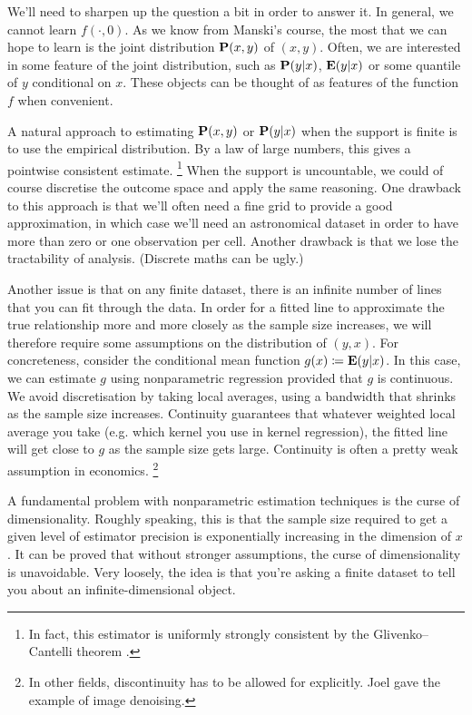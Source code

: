 \documentclass[11pt,letterpaper,reqno,oneside]{article}
\begin{document}
We'll need to sharpen up the question a bit in order to answer it. In general, we cannot learn $f(\cdot,0)$. As we know from Manski's course, the most that we can hope to learn is the joint distribution $\mathbf{P}(x,y)$ of $(x,y)$. Often, we are interested in some feature of the joint distribution, such as $\mathbf{P}(y|x)$, $\mathbf{E}(y|x)$ or some quantile of $y$ conditional on $x$. These objects can be thought of as features of the function $f$ when convenient.

A natural approach to estimating $\mathbf{P}(x,y)$ or $\mathbf{P}(y|x)$ when the support is finite is to use the empirical distribution. By a law of large numbers, this gives a pointwise consistent estimate.%
	\footnote{In fact, this estimator is uniformly strongly consistent by the Glivenko--Cantelli theorem \parencite[][p. 269]{Billingsley1995}.}
When the support is uncountable, we could of course discretise the outcome space and apply the same reasoning. One drawback to this approach is that we'll often need a fine grid to provide a good approximation, in which case we'll need an astronomical dataset in order to have more than zero or one observation per cell. Another drawback is that we lose the tractability of analysis. (Discrete maths can be ugly.)

Another issue is that on any finite dataset, there is an infinite number of lines that you can fit through the data. In order for a fitted line to approximate the true relationship more and more closely as the sample size increases, we will therefore require some assumptions on the distribution of $(y,x)$. For concreteness, consider the conditional mean function $g(x) \coloneqq \mathbf{E}(y|x)$. In this case, we can estimate $g$ using nonparametric regression provided that $g$ is continuous. We avoid discretisation by taking local averages, using a bandwidth that shrinks as the sample size increases. Continuity guarantees that whatever weighted local average you take (e.g. which kernel you use in kernel regression), the fitted line will get close to $g$ as the sample size gets large. Continuity is often a pretty weak assumption in economics.%
	\footnote{In other fields, discontinuity has to be allowed for explicitly. Joel gave the example of image denoising.}

A fundamental problem with nonparametric estimation techniques is the curse of dimensionality. Roughly speaking, this is that the sample size required to get a given level of estimator precision is exponentially increasing in the dimension of $x$. It can be proved that without stronger assumptions, the curse of dimensionality is unavoidable. Very loosely, the idea is that you're asking a finite dataset to tell you about an infinite-dimensional object.
\end{document}
